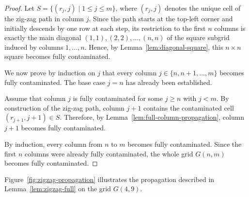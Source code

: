 \documentclass[letterpaper,12pt]{article}
\begin{document}
\begin{proof}
Let $S=\{(r_j,j)\mid 1\le j\le m\}$,  where $(r_j,j)$ denotes the unique cell of the zig-zag path in column $j$. Since the path starts at the top-left corner and initially descends by one row at each step,
its restriction to the first $n$ columns is exactly the main diagonal $(1,1),(2,2),\dots,(n,n)$  of the square subgrid induced by columns $1,\dots,n$.
Hence, by Lemma~\ref{lem:diagonal-square}, this $n\times n$ square becomes fully contaminated.

We now prove by induction on $j$ that every column $j\in\{n,n+1,\dots,m\}$ becomes fully contaminated.
The base case $j=n$ has already been established.

Assume that column $j$ is fully contaminated for some $j\ge n$ with $j<m$.
By construction of the zig-zag path, column $j+1$ contains the contaminated cell $(r_{j+1},j+1)\in S$.
Therefore, by Lemma~\ref{lem:full-column-propagation}, column $j+1$ becomes fully contaminated. 

By induction, every column from $n$ to $m$ becomes fully contaminated.
Since the first $n$ columns were already fully contaminated, the whole grid $G(n,m)$ becomes fully contaminated. \qedhere
\end{proof}

Figure~\ref{fig:zigzag-propagation} illustrates the propagation described in Lemma~\ref{lem:zigzag-full} on the grid $G(4,9)$.
\end{document}
